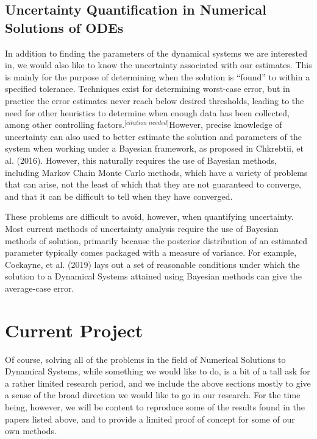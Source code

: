 \documentclass[12pt]{article}
\newcommand{\cn}{$^{\textit{[citation needed]}}$}
\begin{document}
\subsection{Uncertainty Quantification in Numerical Solutions of ODEs}

In addition to finding the parameters of the dynamical systems we are interested in, we would also like to know the uncertainty associated with our estimates. This is mainly for the purpose of determining when the solution is ``found'' to within a specified tolerance. Techniques exist for determining worst-case error, but in practice the error estimates never reach below desired thresholds, leading to the need for other heuristics to determine when enough data has been collected, among other controlling factors.\cn However, precise knowledge of uncertainty can also used to better estimate the solution and parameters of the system when working under a Bayesian framework, as proposed in Chkrebtii, et al. (2016). However, this naturally requires the use of Bayesian methods, including Markov Chain Monte Carlo methods, which have a variety of problems that can arise, not the least of which that they are not guaranteed to converge, and that it can be difficult to tell when they have converged.

These problems are difficult to avoid, however, when quantifying uncertainty. Most current methods of uncertainty analysis require the use of Bayesian methods of solution, primarily because the posterior distribution of an estimated parameter typically comes packaged with a measure of variance. For example, Cockayne, et al. (2019) lays out a set of reasonable conditions under which the solution to a Dynamical Systems attained using Bayesian methods can give the average-case error\cite{cockayne}.


\section{Current Project}

Of course, solving all of the problems in the field of Numerical Solutions to Dynamical Systems, while something we would like to do, is a bit of a tall ask for a rather limited research period, and we include the above sections mostly to give a sense of the broad direction we would like to go in our research. For the time being, however, we will be content to reproduce some of the results found in the papers listed above, and to provide a limited proof of concept for some of our own methods.
\end{document}
